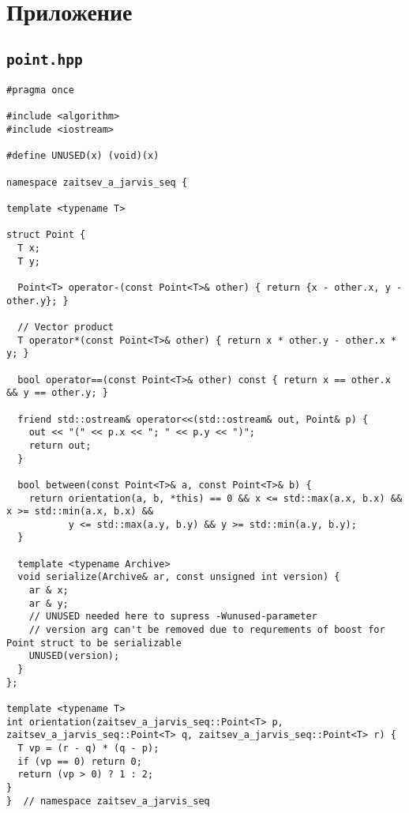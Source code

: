 \documentclass[12pt]{article}
\begin{document}
\section{Приложение}
\subsection{\texttt{point.hpp}}
\begin{lstlisting}
#pragma once

#include <algorithm>
#include <iostream>

#define UNUSED(x) (void)(x)

namespace zaitsev_a_jarvis_seq {

template <typename T>

struct Point {
  T x;
  T y;

  Point<T> operator-(const Point<T>& other) { return {x - other.x, y - other.y}; }

  // Vector product
  T operator*(const Point<T>& other) { return x * other.y - other.x * y; }

  bool operator==(const Point<T>& other) const { return x == other.x && y == other.y; }

  friend std::ostream& operator<<(std::ostream& out, Point& p) {
    out << "(" << p.x << "; " << p.y << ")";
    return out;
  }

  bool between(const Point<T>& a, const Point<T>& b) {
    return orientation(a, b, *this) == 0 && x <= std::max(a.x, b.x) && x >= std::min(a.x, b.x) &&
           y <= std::max(a.y, b.y) && y >= std::min(a.y, b.y);
  }

  template <typename Archive>
  void serialize(Archive& ar, const unsigned int version) {
    ar & x;
    ar & y;
    // UNUSED needed here to supress -Wunused-parameter
    // version arg can't be removed due to requrements of boost for Point struct to be serializable
    UNUSED(version);
  }
};

template <typename T>
int orientation(zaitsev_a_jarvis_seq::Point<T> p, zaitsev_a_jarvis_seq::Point<T> q, zaitsev_a_jarvis_seq::Point<T> r) {
  T vp = (r - q) * (q - p);
  if (vp == 0) return 0;
  return (vp > 0) ? 1 : 2;
}
}  // namespace zaitsev_a_jarvis_seq
\end{lstlisting}
\end{document}
